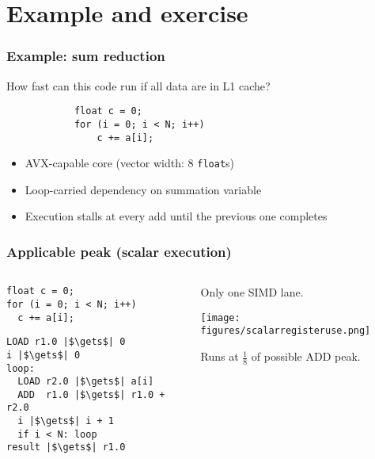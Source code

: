 \documentclass[dvipsnames,presentation,aspectratio=169,14pt]{beamer}
\begin{document}
\section{Example and exercise}

\begin{frame}[fragile]
  \frametitle{Example: sum reduction}

  How fast can this code run if all data are in L1 cache?

  \vskip 11pt

\begin{verbatim}
            float c = 0;
            for (i = 0; i < N; i++)
                c += a[i];
\end{verbatim}

  \vskip 11pt

  \begin{itemize}[itemsep=5pt]
  \item AVX-capable core (vector width: 8 \texttt{float}s)
  \item Loop-carried dependency on summation variable
  \item Execution stalls at every add until the previous one completes
  \end{itemize}
\end{frame}

\begin{frame}[fragile]
  \frametitle{Applicable peak (scalar execution)}
  \begin{columns}
    \begin{column}{0.4\textwidth}\small

\begin{verbatim}
float c = 0;
for (i = 0; i < N; i++)
  c += a[i];
\end{verbatim}


\begin{verbatim}
LOAD r1.0 |$\gets$| 0
i |$\gets$| 0
loop:
  LOAD r2.0 |$\gets$| a[i]
  ADD  r1.0 |$\gets$| r1.0 + r2.0
  i |$\gets$| i + 1
  if i < N: loop
result |$\gets$| r1.0
\end{verbatim}

    \end{column}
    \begin{column}{0.5\textwidth}
      Only one SIMD lane.

      \begin{center}
        \texttt{[image: figures/scalarregisteruse.png]}
      \end{center}

      Runs at $\frac{1}8$ of possible ADD peak.
    \end{column}
  \end{columns}
\end{frame}
\end{document}
